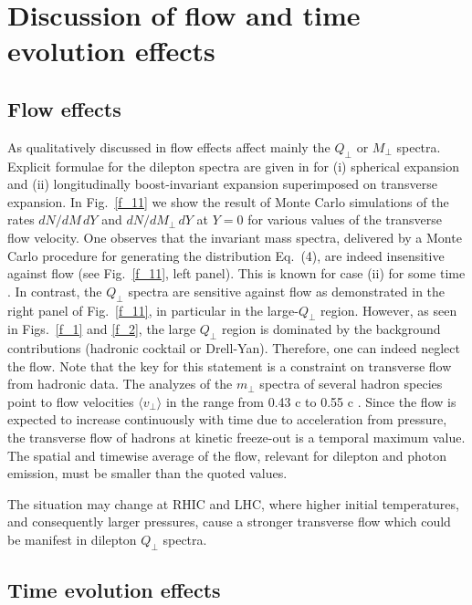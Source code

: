 \section{Discussion of flow and time evolution effects} %

\subsection{Flow effects}

As qualitatively discussed in \cite{Phys.Lett.} flow effects affect
mainly the $Q_\perp$ or $M_\perp$ spectra.
Explicit formulae for the dilepton spectra are given in
\cite{Phys.Lett.} for 
(i) spherical expansion and
(ii) longitudinally boost-invariant expansion superimposed on transverse
expansion. In Fig.~\ref{f_11} we show the result of Monte Carlo simulations
of the rates $dN /d M \, d Y$ and $dN/dM_\perp \, d Y$ 
at $Y = 0$ for
various values of the transverse flow velocity. One observes
that the invariant mass spectra,
delivered by a Monte Carlo procedure for generating the distribution
Eq.~(4), are indeed insensitive against
flow (see Fig.~\ref{f_11}, left panel).
This is known for case (ii) for some time \cite{Kajantie}.
In contrast, the $Q_\perp$ spectra are sensitive against flow
as demonstrated in the right panel of  Fig.~\ref{f_11},
in particular in the large-$Q_\perp$ region. 
However, as seen in Figs.~\ref{f_1} and \ref{f_2}, 
the large $Q_\perp$ region is dominated
by the background contributions (hadronic cocktail or Drell-Yan).
Therefore, one can indeed neglect the flow. Note that the key for this
statement is a constraint on transverse flow from hadronic data. The analyzes
of the $m_\perp$ spectra of several hadron species point to flow velocities
$\langle v_\perp \rangle$ in the range from 0.43 c \cite{J.Phys., Cassing} 
to 0.55 c \cite{Heinz}.
Since the flow is expected to increase continuously with time due to
acceleration from pressure, the transverse flow
of hadrons at kinetic freeze-out is a temporal maximum value.
The spatial and timewise average of the flow, relevant for dilepton
and photon emission, must be smaller than the quoted values. 

The situation may change at RHIC and LHC,
where higher initial temperatures, and consequently larger pressures,
cause a stronger transverse flow which could be manifest in dilepton
$Q_\perp$ spectra.

\subsection{Time evolution effects}

